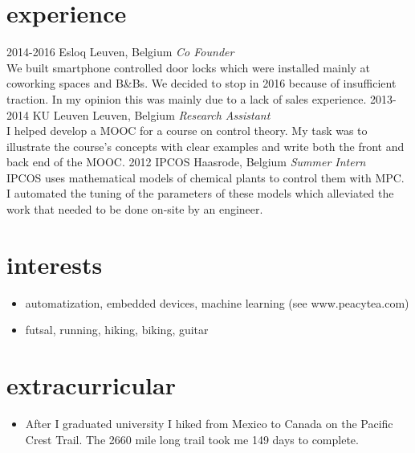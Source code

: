 \documentclass[]{twentysecondcv}
\begin{document}
\section{experience}
\begin{twenty}
  \twentyitem
    {2014-2016}
    {Esloq}
    {Leuven, Belgium}
    {\textit{Co Founder}\\We built smartphone controlled door locks which were installed mainly at coworking spaces and B\&Bs. We decided to stop in 2016 because of insufficient traction. In my opinion this was mainly due to a lack of sales experience.}
  \twentyitem
    {2013-2014}
    {KU Leuven}
    {Leuven, Belgium}
    {\textit{Research Assistant}\\I helped develop a MOOC for a course on control theory. My task was to illustrate the course's concepts with clear examples and write both the front and back end of the MOOC.}
    \twentyitem
    {2012}
    {IPCOS}
    {Haasrode, Belgium}
    {\textit{Summer Intern}\\IPCOS uses mathematical models of chemical plants to control them with MPC. I automated the tuning of the parameters of these models which alleviated the work that needed to be done on-site by an engineer.}
\end{twenty}

\section{interests}
\begin{itemize}
    \item automatization, embedded devices, machine learning (see www.peacytea.com)
  \item futsal, running, hiking, biking, guitar
\end{itemize}

\section{extracurricular}
\begin{itemize}
  \item After I graduated university I hiked from Mexico to Canada on the Pacific Crest Trail. The 2660 mile long trail took me 149 days to complete.\\
\end{itemize}
\end{document}
